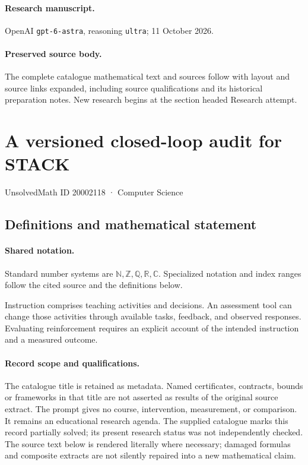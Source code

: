 \documentclass[11pt]{article}
\begin{document}
\paragraph{Research manuscript.} OpenAI \texttt{gpt-6-astra}, reasoning \texttt{ultra}; 11 October 2026.
\paragraph{Preserved source body.} The complete catalogue mathematical text and sources follow with layout and source links expanded, including source qualifications and its historical preparation notes. New research begins at the section headed Research attempt.

\section{A versioned closed-loop audit for STACK}\label{20002118}
{\small UnsolvedMath ID 20002118 · Computer Science}
\subsection{Definitions and mathematical statement}

\paragraph{Shared notation.}Standard number systems are $\mathbb N,\mathbb Z,\mathbb Q,\mathbb R,\mathbb C$. Specialized notation and index ranges follow the cited source and the definitions below.


Instruction comprises teaching activities and decisions. An assessment tool can change those activities through available tasks, feedback, and observed responses. Evaluating reinforcement requires an explicit account of the intended instruction and a measured outcome.
\paragraph{Record scope and qualifications.}
The catalogue title is retained as metadata. Named certificates, contracts, bounds or frameworks in that title are not asserted as results of the original source extract.
The prompt gives no course, intervention, measurement, or comparison. It remains an educational research agenda. The supplied catalogue marks this record partially solved; its present research status was not independently checked.
The source text below is rendered literally where necessary; damaged formulas and composite extracts are not silently repaired into a new mathematical claim.
\end{document}
